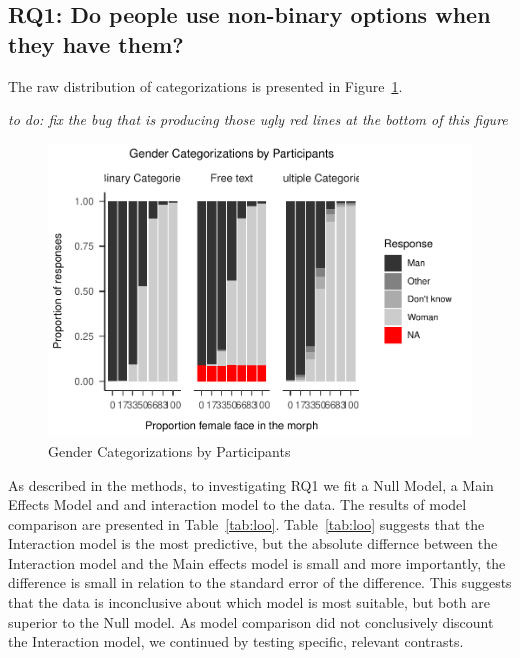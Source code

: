 \documentclass[
  man]{apa7}
\begin{document}
\hypertarget{rq1-do-people-use-non-binary-options-when-they-have-them}{%
\subsection{RQ1: Do people use non-binary options when they have them?}\label{rq1-do-people-use-non-binary-options-when-they-have-them}}

The raw distribution of categorizations is presented in Figure~\ref{fig:descriptives}.

\emph{to do: fix the bug that is producing those ugly red lines at the bottom of this figure}

\begin{figure}
\centering
\includegraphics{resp_opts_manus23022_files/figure-latex/descriptives-1.pdf}
\caption{\label{fig:descriptives}Gender Categorizations by Participants}
\end{figure}

As described in the methods, to investigating RQ1 we fit a Null Model, a Main Effects Model and and interaction model to the data. The results of model comparison are presented in Table~\ref{tab:loo}.
Table~\ref{tab:loo} suggests that the Interaction model is the most predictive, but the absolute differnce between the Interaction model and the Main effects model is small and more importantly, the difference is small in relation to the standard error of the difference. This suggests that the data is inconclusive about which model is most suitable, but both are superior to the Null model. As model comparison did not conclusively discount the Interaction model, we continued by testing specific, relevant contrasts.
\end{document}
